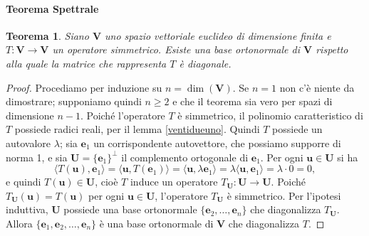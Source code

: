 \documentclass{article}
\theoremstyle{plain}
\newtheorem{thm}{Teorema}[section]
\theoremstyle{definition}
\theoremstyle{remark}
\begin{document}
\paragraph{Teorema Spettrale}
\begin{bxthm}
\begin{thm}
Siano $\mathbf{V}$ uno spazio vettoriale euclideo di dimensione finita e $T: \mathbf{V} \to \mathbf{V}$ un 
operatore simmetrico. Esiste una base ortonormale di $\mathbf{V}$ rispetto alla quale la matrice che rappresenta $T$ è diagonale.
\end{thm}    
\end{bxthm}
\begin{proof}
Procediamo per induzione su $n = \dim(\mathbf{V})$. Se $n = 1$ non c'è niente da dimostrare; supponiamo quindi 
$n \geq 2$ e che il teorema sia vero per spazi di dimensione $n-1$. Poiché l'operatore $T$ è simmetrico, il polinomio caratteristico di $T$
possiede radici reali, per il lemma \ref{ventidueuno}. Quindi $T$ possiede un autovalore $\lambda$; sia 
$\mathbf{e}_1$ un corrispondente autovettore, che possiamo supporre di norma 1, e sia 
$\mathbf{U} = \{\mathbf{e}_1\}^{\perp}$ il complemento ortogonale di $\mathbf{e}_1$. Per ogni 
$\mathbf{u} \in \mathbf{U}$ si ha
\[\langle T(\mathbf{u}), \mathbf{e}_1 \rangle = \langle \mathbf{u}, T(\mathbf{e}_1) \rangle = \langle \mathbf{u}, \lambda \mathbf{e}_1 \rangle = \lambda \langle \mathbf{u}, \mathbf{e}_1 \rangle = \lambda \cdot 0 = 0,\]
e quindi $T(\mathbf{u}) \in \mathbf{U}$, cioè $T$ induce un operatore $T_\mathbf{U} : \mathbf{U} \to \mathbf{U}$. Poiché $T_\mathbf{U}(\mathbf{u}) = T(\mathbf{u})$ per ogni 
$\mathbf{u} \in \mathbf{U}$, l'operatore $T_\mathbf{U}$ è simmetrico. Per l'ipotesi induttiva, $\mathbf{U}$ 
possiede una base ortonormale $\{\mathbf{e}_2, \ldots, \mathbf{e}_n\}$ che diagonalizza $T_\mathbf{U}$. 
Allora $\{\mathbf{e}_1, \mathbf{e}_2, \ldots, \mathbf{e}_n\}$ è una base ortonormale di $\mathbf{V}$ che diagonalizza $T$.
\end{proof}
\end{document}

